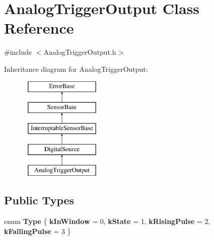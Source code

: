 \hypertarget{classAnalogTriggerOutput}{\section{\-Analog\-Trigger\-Output \-Class \-Reference}
\label{classAnalogTriggerOutput}
}


{\ttfamily \#include $<$\-Analog\-Trigger\-Output.\-h$>$}

\-Inheritance diagram for \-Analog\-Trigger\-Output\-:\begin{figure}[H]
\begin{center}
\leavevmode
\includegraphics[height=5.000000cm]{classAnalogTriggerOutput}
\end{center}
\end{figure}
\subsection*{\-Public \-Types}
\begin{DoxyCompactItemize}
\item 
enum {\bfseries \-Type} \{ {\bfseries k\-In\-Window} = 0, 
{\bfseries k\-State} = 1, 
{\bfseries k\-Rising\-Pulse} = 2, 
{\bfseries k\-Falling\-Pulse} = 3
 \}
\end{DoxyCompactItemize}
